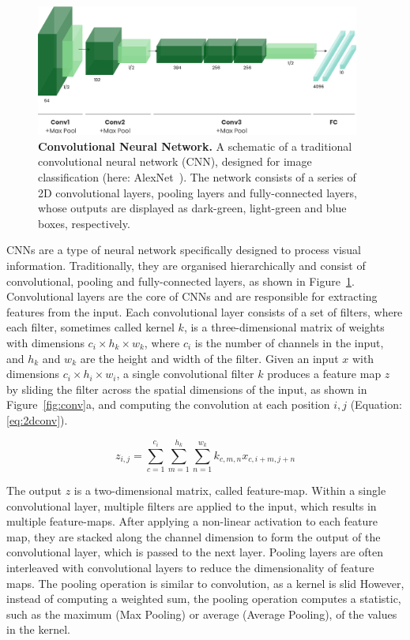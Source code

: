 \documentclass[a4paper]{article}
\begin{document}
\begin{figure}
  \begin{center}
    \includegraphics[width=0.95\textwidth]{./figures/alexnet.png}
  \end{center}
  \caption{\textbf{Convolutional Neural Network.} A schematic of a traditional
    convolutional neural network (CNN), designed for image classification (here:
    AlexNet~\cite{alexnet}). The network consists of a series of 2D
    convolutional layers, pooling layers and fully-connected layers, whose
  outputs are displayed as dark-green, light-green and blue boxes, respectively.
}
  \label{fig:cnn}
\end{figure}


CNNs are a type of neural network specifically designed to process visual
information. Traditionally, they are organised hierarchically and consist of
convolutional, pooling and fully-connected layers, as shown in
Figure~\ref{fig:cnn}. Convolutional layers are the core of CNNs and are
responsible for extracting features from the input. Each convolutional layer
consists of a set of filters, where each filter, sometimes called kernel $k$, is
a three-dimensional matrix of weights with dimensions $c_i \times h_k \times
w_k$, where $c_i$ is the number of channels in the input, and $h_k$ and $w_k$
are the height and width of the filter. Given an input $x$ with dimensions $c_i
\times h_i \times w_i$, a single convolutional filter $k$ produces a feature map
$z$ by sliding the filter across the spatial dimensions of the input, as shown
in Figure~\ref{fig:conv}a, and computing the convolution at each position
${i,j}$ (Equation: \ref{eq:2dconv}).

\begin{equation}
  z_{i,j} = \sum_{c=1}^{c_i} \sum_{m=1}^{h_k} \sum_{n=1}^{w_k} 
  k_{c,m,n} x_{c,i+m,j+n}
  \label{eq:2dconv}
\end{equation}

The output $z$ is a two-dimensional matrix, called feature-map. Within a single
convolutional layer, multiple filters are applied to the input, which results in
multiple feature-maps. After applying a non-linear activation to each feature
map, they are stacked along the channel dimension to form the output of the
convolutional layer, which is passed to the next layer. Pooling layers are often
interleaved with convolutional layers to reduce the dimensionality of feature
maps. The pooling operation is similar to convolution, as a kernel is slid
However, instead of computing a weighted sum, the pooling operation computes a
statistic, such as the maximum (Max Pooling) or average (Average Pooling), of
the values in the kernel.
\end{document}
